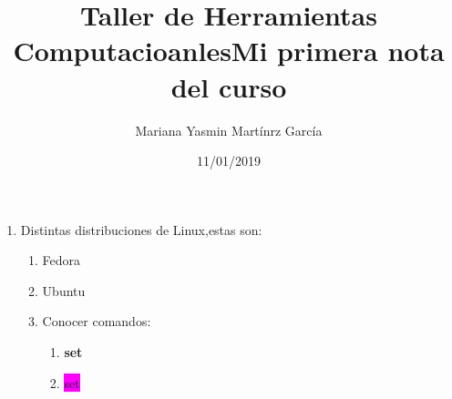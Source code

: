 \documentclass[letterpaper, 12pt, oneside]{article}%
\title{\Huge Taller de Herramientas Computacioanles}
\author{Mariana Yasmin Martínrz García}
\date{11/01/2019}
\begin{document}
	\maketitle
	\newpage
	
	\title{\Huge\textbf{Mi primera nota del curso\\}}
	
	
	\begin{enumerate}
		\item Distintas distribuciones de Linux,estas son:
		\begin{enumerate}
			\item Fedora
			\item Ubuntu
		\item Conocer comandos:
		\begin{enumerate}
			\item \color{red}\textbf{set}\
			\item\color{black}\colorbox{magenta}{set}
		\end{enumerate}
		\end{enumerate} 
	\end{enumerate}
\end{document}
